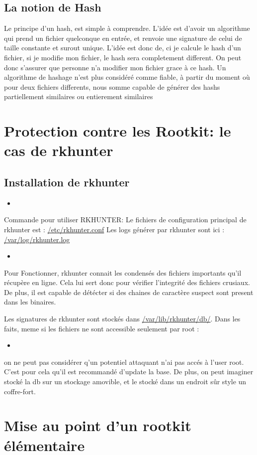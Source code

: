 \documentclass[10pt,a4paper]{article}
\newcommand{\insertcode}[2]{\begin{itemize}\item[]\end{itemize}}
\begin{document}
 \subsection{La notion de Hash}
 Le principe d'un hash, est simple à comprendre. L'idée est d'avoir un algorithme qui prend un fichier quelconque en entrée, et renvoie une signature de celui de taille constante et surout unique.
 L'idée est donc de, ci je calcule le hash d'un fichier, si je modifie mon fichier, le hash sera completement different.
 On peut donc s'assurer que personne n'a modifier mon fichier grace à ce hash.
 Un algorithme de hashage n'est plus considéré comme fiable, à partir du moment où pour deux fichiers differents, nous somme capable de générer des hashs partiellement similaires ou entierement similaires
 
\section{Protection contre les Rootkit:  le cas de rkhunter}
\subsection{   Installation de rkhunter }
\insertcode{commande/installRkhunter.txt}{Installation de RKHUNTER}

Commande pour utiliser RKHUNTER:
Le fichiers de configuration principal de rkhunter est : \url{/etc/rkhunter.conf}
Les logs générer par rkhunter sont ici : \url{/var/log/rkhunter.log}
\insertcode{commande/manrkhunter.txt}{Commade pour utiliser RKHUNTER }

Pour Fonctionner, rkhunter connait les condensés des fichiers importants  qu'il récupère en ligne. Cela lui sert donc pour vérifier l'integrité des fichiers crusiaux. De plus, il est capable de détécter si des chaines de caractère suspect sont present dans les binaires.

Les signatures de rkhunter sont stockés dans \url{/var/lib/rkhunter/db/}.
Dans les faits, meme si les fichiers ne sont accessible seulement par root :
\insertcode{commande/lsdb.txt}{Droits du dossier ``signature''}
on ne peut pas considérer q'un potentiel attaquant n'ai pas accés à l'user root. C'est pour cela qu'il est recommandé d'update la base. De plus, on peut imaginer stocké la db sur un stockage amovible, et le stocké dans un endroit sûr style un coffre-fort. 
\section{Mise au point d'un rootkit élémentaire }
\end{document}
